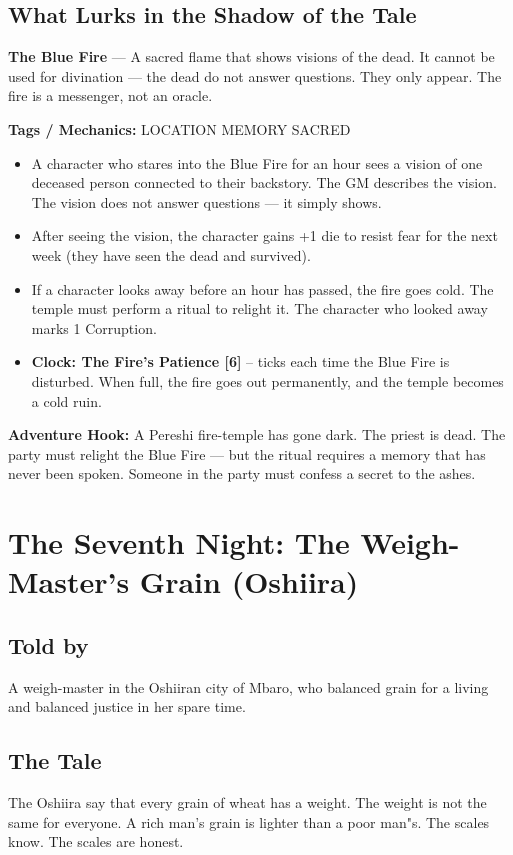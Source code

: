 \documentclass[10pt,twoside]{book}
\newcommand{\tag}[1]{\textsc{#1}}
\begin{document}
\section*{What Lurks in the Shadow of the Tale}
\begin{infobox}
\textbf{The Blue Fire} --- A sacred flame that shows visions of the dead. It cannot be used for divination --- the dead do not answer questions. They only appear. The fire is a messenger, not an oracle.

\textbf{Tags / Mechanics:} \tag{LOCATION} \tag{MEMORY} \tag{SACRED}

\begin{itemize}
\item A character who stares into the Blue Fire for an hour sees a vision of one deceased person connected to their backstory. The GM describes the vision. The vision does not answer questions --- it simply shows.
\item After seeing the vision, the character gains +1 die to resist fear for the next week (they have seen the dead and survived).
\item If a character looks away before an hour has passed, the fire goes cold. The temple must perform a ritual to relight it. The character who looked away marks 1 Corruption.
\item \textbf{Clock: The Fire's Patience [6]} -- ticks each time the Blue Fire is disturbed. When full, the fire goes out permanently, and the temple becomes a cold ruin.
\end{itemize}

\textbf{Adventure Hook:} A Pereshi fire-temple has gone dark. The priest is dead. The party must relight the Blue Fire --- but the ritual requires a memory that has never been spoken. Someone in the party must confess a secret to the ashes.
\end{infobox}

\chapter{The Seventh Night: The Weigh-Master's Grain (Oshiira)}

\section*{Told by}
A weigh-master in the Oshiiran city of Mbaro, who balanced grain for a living and balanced justice in her spare time.

\section*{The Tale}
The Oshiira say that every grain of wheat has a weight. The weight is not the same for everyone. A rich man's grain is lighter than a poor man"s. The scales know. The scales are honest.
\end{document}
